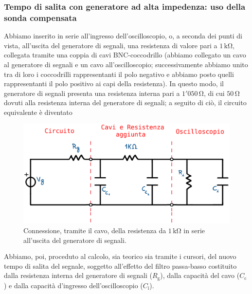 \documentclass[a4paper]{article}
\begin{document}
			\subsubsection{Tempo di salita con generatore ad alta impedenza: uso della sonda compensata}
				Abbiamo inserito in serie all'ingresso dell'oscilloscopio, o, a seconda dei punti di vista, all'uscita del generatore di segnali, una resistenza di valore pari a $ 1 \, \mathrm{k\Omega} $, collegata tramite una coppia di cavi BNC-coccodrillo (abbiamo collegato un cavo al generatore di segnali e un cavo all'oscilloscopio; successivamente abbiamo unito tra di loro i coccodrilli rappresentanti il polo negativo e abbiamo posto quelli rappresentanti il polo positivo ai capi della resistenza). In questo modo, il generatore di segnali presenta una resistenza interna pari a $ 1'050 \, \mathrm{\Omega} $, di cui $ 50 \, \mathrm{\Omega} $ dovuti alla resistenza interna del generatore di segnali; a seguito di ciò, il circuito equivalente è diventato
				\begin{figure}[h!]
					\centering
					\includegraphics[scale=0.5]{circuitoResistenzaSerieCavo}
					\caption{Connessione, tramite il cavo, della resistenza da $ 1 \, \mathrm{k\Omega} $ in serie all'uscita del generatore di segnali.}
					\label{fig:circuitoResistenzaSerieCavo}
				\end{figure}
				\newpage
				Abbiamo, poi, proceduto al calcolo, sia teorico sia tramite i cursori, del nuovo tempo di salita del segnale, soggetto all'effetto del filtro passa-basso costituito dalla resistenza interna del generatore di segnali ($ R_{\mathrm{g}} $), dalla capacità del cavo ($ C_{\mathrm{c}} $) e dalla capacità d'ingresso dell'oscilloscopio ($ C_{\mathrm{i}} $).
\end{document}
